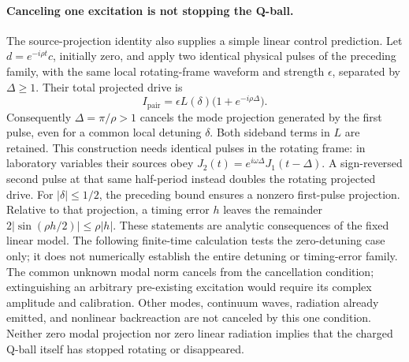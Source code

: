\paragraph{Canceling one excitation is not stopping the Q-ball.}
The source-projection identity also supplies a simple linear control prediction.
Let $d=e^{-i\rho t}c$, initially zero, and apply two identical physical pulses
of the preceding family, with the same local rotating-frame waveform and
strength $\epsilon$, separated by $\Delta\geq1$.
Their total projected drive is
\begin{equation}
 I_{\mathrm{pair}}=\epsilon L(\delta)
                 \bigl(1+e^{-i\rho\Delta}\bigr).
 \label{env:counterpulse}
\end{equation}
Consequently $\Delta=\pi/\rho>1$ cancels the mode projection generated by the
first pulse, even for a common local detuning $\delta$. Both sideband terms
in $L$ are retained. This construction needs identical pulses in the
rotating frame: in laboratory variables their sources obey
$J_2(t)=e^{i\omega\Delta}J_1(t-\Delta)$.
A sign-reversed second pulse at that same half-period instead doubles the
rotating projected drive. For $|\delta|\leq1/2$, the preceding bound ensures
a nonzero first-pulse projection. Relative to that projection, a timing
error $h$ leaves the remainder $2|\sin(\rho h/2)|\leq\rho|h|$.
These statements are analytic consequences of the fixed linear model.
The following finite-time calculation tests the zero-detuning case only;
it does not numerically establish the entire detuning or timing-error family.
The common unknown modal norm cancels
from the cancellation condition; extinguishing an arbitrary pre-existing
excitation would require its complex amplitude and calibration.
Other modes, continuum waves, radiation already emitted, and nonlinear
backreaction are not canceled by this one condition. Neither zero modal
projection nor zero linear radiation implies that the charged Q-ball itself
has stopped rotating or disappeared.
